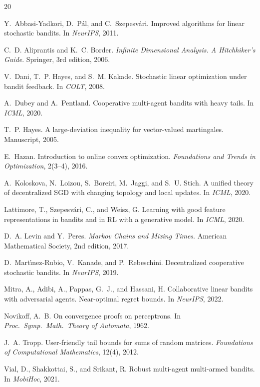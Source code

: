\documentclass[11pt]{article}
\begin{document}
\begin{thebibliography}{20}

Y.~Abbasi-Yadkori, D.~P\'al, and C.~Szepesv\'ari.
\newblock Improved algorithms for linear stochastic bandits.
\newblock In \emph{NeurIPS}, 2011.

C.~D. Aliprantis and K.~C. Border.
\newblock \emph{Infinite Dimensional Analysis. A Hitchhiker's Guide}.
\newblock Springer, 3rd edition, 2006.

V.~Dani, T.~P. Hayes, and S.~M. Kakade.
\newblock Stochastic linear optimization under bandit feedback.
\newblock In \emph{COLT}, 2008.

A.~Dubey and A.~Pentland.
\newblock Cooperative multi-agent bandits with heavy tails.
\newblock In \emph{ICML}, 2020.

T.~P. Hayes.
\newblock A large-deviation inequality for vector-valued martingales.
\newblock Manuscript, 2005.

E.~Hazan.
\newblock Introduction to online convex optimization.
\newblock \emph{Foundations and Trends in Optimization}, 2(3--4), 2016.

A.~Koloskova, N.~Loizou, S.~Boreiri, M.~Jaggi, and S.~U. Stich.
\newblock A unified theory of decentralized SGD with changing topology
  and local updates.
\newblock In \emph{ICML}, 2020.

Lattimore, T., Szepesv\'ari, C., and Weisz, G.
\newblock Learning with good feature representations in bandits and in
  RL with a generative model.
\newblock In \emph{ICML}, 2020.

D.~A. Levin and Y.~Peres.
\newblock \emph{Markov Chains and Mixing Times}.
\newblock American Mathematical Society, 2nd edition, 2017.

D.~Mart{\'\i}nez-Rubio, V.~Kanade, and P.~Rebeschini.
\newblock Decentralized cooperative stochastic bandits.
\newblock In \emph{NeurIPS}, 2019.

Mitra, A., Adibi, A., Pappas, G.~J., and Hassani, H.
\newblock Collaborative linear bandits with adversarial agents. Near-optimal regret bounds.
\newblock In \emph{NeurIPS}, 2022.

Novikoff, A.~B.
\newblock On convergence proofs on perceptrons.
\newblock In \emph{Proc.\ Symp.\ Math.\ Theory of Automata}, 1962.

J.~A. Tropp.
\newblock User-friendly tail bounds for sums of random matrices.
\newblock \emph{Foundations of Computational Mathematics}, 12(4), 2012.

Vial, D., Shakkottai, S., and Srikant, R.
\newblock Robust multi-agent multi-armed bandits.
\newblock In \emph{MobiHoc}, 2021.

\end{thebibliography}
\end{document}
